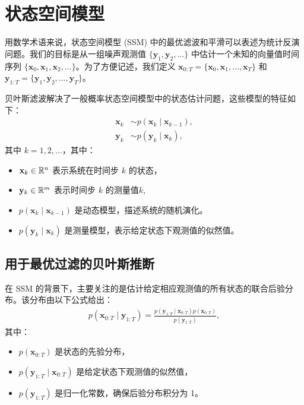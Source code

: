 \section{状态空间模型}
用数学术语来说，状态空间模型 (SSM) 中的最优滤波和平滑可以表述为统计反演问题。我们的目标是从一组噪声观测值 \(\{\mathbf{y}_1, \mathbf{y}_2, \dots\}\) 中估计一个未知的向量值时间序列 \(\{\mathbf{x}_0, \mathbf{x}_1, \mathbf{x}_2, \dots\}\)。为了方便记述，我们定义 \(\textbf{x}_{0:T} = \{ \textbf{x}_0, \textbf{x}_1, \dots, \textbf{x}_T \}\) 和 \(\textbf{y}_{1:T} = \{ \textbf{y}_1, \textbf{y}_2, \dots, \textbf{y}_T \}\)。

贝叶斯滤波解决了一般概率状态空间模型中的状态估计问题，这些模型的特征如下：
\begin{align}
\mathbf{x}_k &\sim p(\mathbf{x}_k \mid \mathbf{x}_{k-1}), \\
\mathbf{y}_k &\sim p(\mathbf{y}_k \mid \mathbf{x}_k),
\end{align}
其中 \(k = 1, 2, \dots\)，其中：
\begin{itemize}
\item \(\mathbf{x}_k \in \mathbb{R}^n\) 表示系统在时间步 \(k\) 的状态，
\item \(\mathbf{y}_k \in \mathbb{R}^m\) 表示时间步 \(k\) 的测量值\(k\),
\item \(p(\mathbf{x}_k \mid \mathbf{x}_{k-1})\) 是动态模型，描述系统的随机演化。
\item \(p(\mathbf{y}_k \mid \mathbf{x}_k)\) 是测量模型，表示给定状态下观测值的似然值。
\end{itemize}

\subsection{用于最优过滤的贝叶斯推断}
在 SSM 的背景下，主要关注的是估计给定相应观测值的所有状态的联合后验分布。该分布由以下公式给出：
\begin{align}
p(\mathbf{x}_{0:T} \mid \mathbf{y}_{1:T}) = \frac{p(\mathbf{y}_{1:T} \mid \mathbf{x}_{0:T}) p(\mathbf{x}_{0:T})}{p(\mathbf{y}_{1:T})},
\end{align}
其中：
\begin{itemize}
\item \(p(\mathbf{x}_{0:T})\) 是状态的先验分布，
\item \(p(\mathbf{y}_{1:T} \mid \mathbf{x}_{0:T})\) 是给定状态下观测值的似然值，
\item \(p(\mathbf{y}_{1:T})\) 是归一化常数，确保后验分布积分为 1。
\end{itemize}

